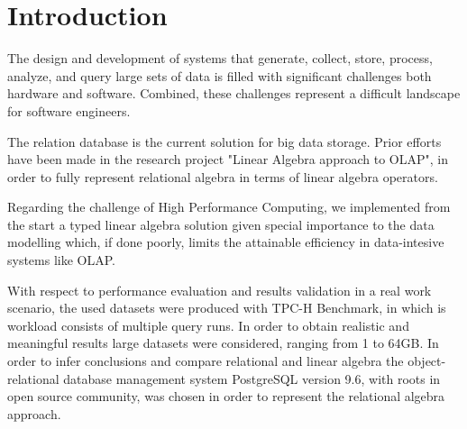 
\section{Introduction}
\indent

The design and development of systems that generate, collect, store, process, analyze, and query large sets of data is filled with significant challenges both hardware and software. Combined, these challenges represent a difficult landscape for software engineers.\par 
The relation database is the current solution 	for big data storage.
Prior efforts have been made \cite{macedo2015linear} \cite{da2015benchmarking} in the research project "Linear Algebra approach to OLAP", in order to fully represent relational algebra in terms of linear algebra operators.
\par Regarding the challenge of High Performance Computing, we implemented from the start a typed linear algebra solution given special importance to the data modelling which, if done poorly, limits the attainable efficiency in data-intesive systems like OLAP.\par 
With respect to performance evaluation and results validation in a real work scenario, the used datasets were produced with TPC-H Benchmark, in which is workload consists of multiple query runs.
In order to obtain realistic and meaningful results large datasets were considered, ranging from 1 to 64GB. 
In order to infer conclusions and compare relational and linear algebra the  object-relational database management system PostgreSQL version 9.6, with roots in open source community, was chosen in order to represent the relational algebra approach. 




